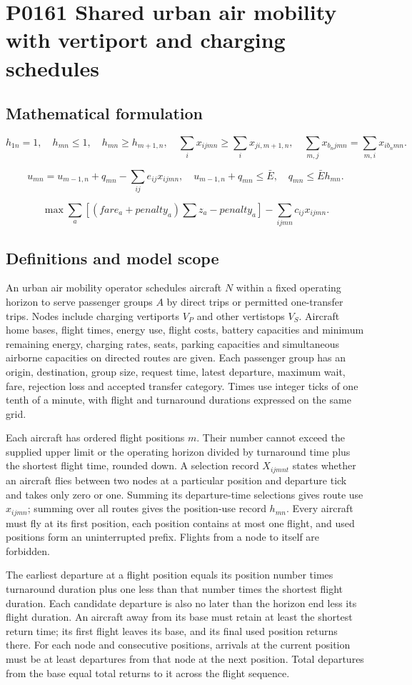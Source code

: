 \documentclass[10pt]{article}
\begin{document}
\section*{P0161 Shared urban air mobility with vertiport and charging schedules}
\subsection*{Mathematical formulation}
\[
h_{1n}=1,\quad h_{mn}\le1,\quad h_{mn}\ge h_{m+1,n},\quad
\sum_ix_{ijmn}\ge\sum_ix_{ji,m+1,n},
\quad\sum_{m,j}x_{b_njmn}=\sum_{m,i}x_{ib_nmn}.
\]

\[
u_{mn}=u_{m-1,n}+q_{mn}-\sum_{ij}e_{ij}x_{ijmn},\quad
u_{m-1,n}+q_{mn}\le\bar E,\quad q_{mn}\le\bar Eh_{mn}.
\]

\[
\max\sum_a[(fare_a+penalty_a)\sum z_a-penalty_a]
-\sum_{ijmn}c_{ij}x_{ijmn}.
\]

\subsection*{Definitions and model scope}
An urban air mobility operator schedules aircraft $N$ within a fixed operating horizon to serve passenger groups $A$ by direct trips or permitted one-transfer trips. Nodes include charging vertiports $V_P$ and other vertistops $V_S$. Aircraft home bases, flight times, energy use, flight costs, battery capacities and minimum remaining energy, charging rates, seats, parking capacities and simultaneous airborne capacities on directed routes are given. Each passenger group has an origin, destination, group size, request time, latest departure, maximum wait, fare, rejection loss and accepted transfer category. Times use integer ticks of one tenth of a minute, with flight and turnaround durations expressed on the same grid.

Each aircraft has ordered flight positions $m$. Their number cannot exceed the supplied upper limit or the operating horizon divided by turnaround time plus the shortest flight time, rounded down. A selection record $X_{ijmnt}$ states whether an aircraft flies between two nodes at a particular position and departure tick and takes only zero or one. Summing its departure-time selections gives route use $x_{ijmn}$; summing over all routes gives the position-use record $h_{mn}$. Every aircraft must fly at its first position, each position contains at most one flight, and used positions form an uninterrupted prefix. Flights from a node to itself are forbidden.

The earliest departure at a flight position equals its position number times turnaround duration plus one less than that number times the shortest flight duration. Each candidate departure is also no later than the horizon end less its flight duration. An aircraft away from its base must retain at least the shortest return time; its first flight leaves its base, and its final used position returns there. For each node and consecutive positions, arrivals at the current position must be at least departures from that node at the next position. Total departures from the base equal total returns to it across the flight sequence.
\end{document}
